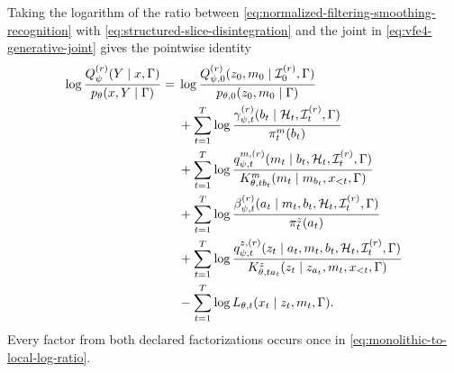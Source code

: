 Taking the logarithm of the ratio between \cref{eq:normalized-filtering-smoothing-recognition} with \cref{eq:structured-slice-disintegration} and the joint in \cref{eq:vfe4-generative-joint} gives the pointwise identity
\begin{equation}
\begin{aligned}
\log\frac{Q_\psi^{(r)}(Y\mid x,\Gamma)}
{p_\theta(x,Y\mid\Gamma)}
={}&
\log\frac{Q_{\psi,0}^{(r)}
(z_0,m_0\mid\mathcal I_0^{(r)},\Gamma)}
{p_{\theta,0}(z_0,m_0\mid\Gamma)}\\
&+\sum_{t=1}^{T}
\log\frac{\gamma_{\psi,t}^{(r)}
(b_t\mid\mathcal H_t,\mathcal I_t^{(r)},\Gamma)}
{\pi_t^m(b_t)}\\
&+\sum_{t=1}^{T}
\log\frac{q_{\psi,t}^{m,(r)}
(m_t\mid b_t,\mathcal H_t,\mathcal I_t^{(r)},\Gamma)}
{K^m_{\theta,tb_t}
(m_t\mid m_{b_t},x_{<t},\Gamma)}\\
&+\sum_{t=1}^{T}
\log\frac{\beta_{\psi,t}^{(r)}
(a_t\mid m_t,b_t,\mathcal H_t,
\mathcal I_t^{(r)},\Gamma)}
{\pi_t^z(a_t)}\\
&+\sum_{t=1}^{T}
\log\frac{q_{\psi,t}^{z,(r)}
(z_t\mid a_t,m_t,b_t,\mathcal H_t,
\mathcal I_t^{(r)},\Gamma)}
{K^z_{\theta,ta_t}
(z_t\mid z_{a_t},m_t,x_{<t},\Gamma)}\\
&-\sum_{t=1}^{T}
\log L_{\theta,t}(x_t\mid z_t,m_t,\Gamma).
\end{aligned}
\label{eq:monolithic-to-local-log-ratio}
\end{equation}
Every factor from both declared factorizations occurs once in \cref{eq:monolithic-to-local-log-ratio}.

